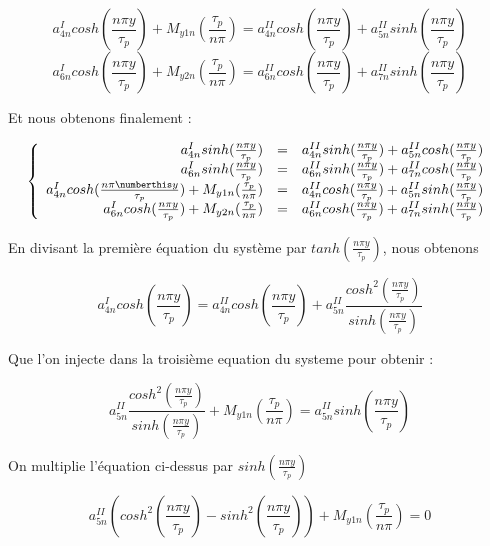 \begin{equation}
    a_{4n}^{I}cosh(\frac{n\pi y}{\tau_p})+M_{y1n}(\frac{\tau_p}{n\pi})=a_{4n}^{II}cosh(\frac{n\pi y}{\tau_p})+a_{5n}^{II}sinh(\frac{n\pi y}{\tau_p})
\end{equation}
\begin{equation}
    a_{6n}^{I}cosh(\frac{n\pi y}{\tau_p})+M_{y2n}(\frac{\tau_p}{n\pi}) = a_{6n}^{II}cosh(\frac{n\pi y}{\tau_p})+a_{7n}^{II}sinh(\frac{n\pi y}{\tau_p})
\end{equation}

Et nous obtenons finalement :

\[
\left\{
\begin{array}{r c l}
    a_{4n}^Isinh(\frac{n\pi y}{\tau_p}) &=&a_{4n}^{II}sinh(\frac{n\pi y}{\tau_p})+a_{5n}^{II}cosh(\frac{n\pi y}{\tau_p}) \\
    a_{6n}^Isinh(\frac{n\pi y}{\tau_p})&=& a_{6n}^{II}sinh(\frac{n\pi y}{\tau_p})+a_{7n}^{II}cosh(\frac{n\pi y}{\tau_p}) \\
    a_{4n}^{I}cosh(\frac{n\pi \numberthis y}{\tau_p})+M_{y1n}(\frac{\tau_p}{n\pi})&=&a_{4n}^{II}cosh(\frac{n\pi y}{\tau_p})+a_{5n}^{II}sinh(\frac{n\pi y}{\tau_p}) \\
    a_{6n}^{I}cosh(\frac{n\pi y}{\tau_p})+M_{y2n}(\frac{\tau_p}{n\pi}) &=& a_{6n}^{II}cosh(\frac{n\pi y}{\tau_p})+a_{7n}^{II}sinh(\frac{n\pi y}{\tau_p})
\end{array}
\right.
\]

En divisant la première équation du système par $tanh(\frac{n\pi y}{\tau_p})$, nous obtenons

\begin{equation}
    a_{4n}^Icosh(\frac{n\pi y}{\tau_p}) =a_{4n}^{II}cosh(\frac{n\pi y}{\tau_p})+a_{5n}^{II}\frac{cosh^2(\frac{n\pi y}{\tau_p})}{sinh(\frac{n\pi y}{\tau_p})}
\end{equation}

Que l'on injecte dans la troisième equation du systeme pour obtenir :

\begin{equation}
    a_{5n}^{II}\frac{cosh^2(\frac{n\pi y}{\tau_p})}{sinh(\frac{n\pi y}{\tau_p})}+M_{y1n}(\frac{\tau_p}{n\pi})=a_{5n}^{II}sinh(\frac{n\pi y}{\tau_p})
\end{equation}

On multiplie l'équation ci-dessus par $sinh(\frac{n\pi y}{\tau_p})$

\begin{equation}
    a_{5n}^{II}\left(cosh^2(\frac{n\pi y}{\tau_p})-sinh^2(\frac{n\pi y}{\tau_p})\right)+M_{y1n}(\frac{\tau_p}{n\pi})=0
\end{equation}

